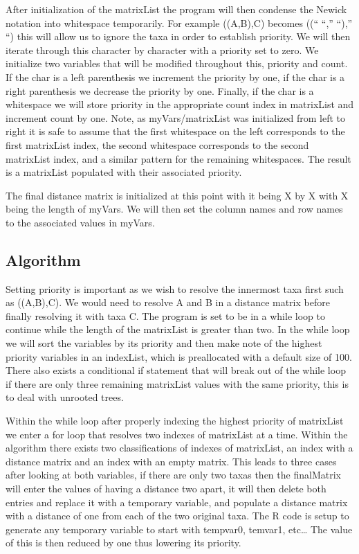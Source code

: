 \documentclass{article}
\begin{document}
After initialization of the matrixList the program will then condense the Newick notation into whitespace temporarily. For example ((A,B),C) becomes ((“ “,” “),” “) this will allow us to ignore the taxa in order to establish priority. We will then iterate through this character by character with a priority set to zero. We initialize two variables that will be modified throughout this, priority and count. If the char is a left parenthesis we increment the priority by one, if the char is a right parenthesis we decrease the priority by one. Finally, if the char is a whitespace we will store priority in the appropriate count index in matrixList and increment count by one. Note, as myVars/matrixList was initialized from left to right it is safe to assume that the first whitespace on the left corresponds to the first matrixList index, the second whitespace corresponds to the second matrixList index, and a similar pattern for the remaining whitespaces. The result is a matrixList populated with their associated priority. 

The final distance matrix is initialized at this point with it being X by X with X being the length of myVars. We will then set the column names and row names to the associated values in myVars. 


\subsection{Algorithm}

Setting priority is important as we wish to resolve the innermost taxa first such as ((A,B),C). We would need to resolve A and B in a distance matrix before finally resolving it with taxa C.  The program is set to be in a while loop to continue while the length of the matrixList is greater than two. In the while loop we will sort the variables by its priority and then make note of the highest priority variables in an indexList, which is preallocated with a default size of 100. There also exists a conditional if statement that will break out of the while loop if there are only three remaining matrixList values with the same priority, this is to deal with unrooted trees.

Within the while loop after properly indexing the highest priority of matrixList we enter a for loop that resolves two indexes of matrixList at a time. Within the algorithm there exists two classifications of indexes of matrixList, an index with a distance matrix and an index with an empty matrix. This leads to three cases after looking at both variables, if there are only two taxas then the finalMatrix will enter the values of having a distance two apart, it will then delete both entries and replace it with a temporary variable, and populate a distance matrix with a distance of one from each of the two original taxa. The R code is setup to generate any temporary variable to start with tempvar0, temvar1, etc… The value of this is then reduced by one thus lowering its priority. 
\end{document}
